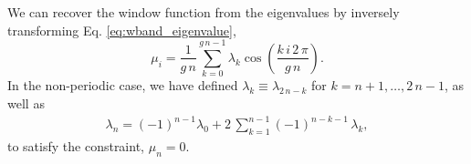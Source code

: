 \documentclass[preprint, superscriptaddress, floatfix]{revtex4-1}
\begin{document}

We can recover the window function from the eigenvalues
by inversely transforming Eq. \eqref{eq:wband_eigenvalue},
%
\begin{equation}
  \mu_i
  =
  \frac { 1 } { g \, n }
  \sum_{ k = 0 }^{ g \, n - 1 }
  \lambda_k
  \cos \left(
       \frac{ k \, i \, 2 \, \pi }
            {      g \, n        }
  \right)
  .
\label{eq:mu_from_lambda}
\end{equation}
%
In the non-periodic case,
we have defined
$\lambda_k \equiv \lambda_{2 \, n - k}$
for $k = n + 1, \dots, 2 \, n - 1$,
as well as
%
\begin{align}
  \lambda_n
  =
  (-1)^{ n - 1 }
  \lambda_0
  +
  2 \, \sum_{ k = 1 }^{ n - 1 }
      (-1)^{n - k - 1} \, \lambda_k
  ,
\label{eq:lambdan}
\end{align}
to satisfy the constraint, $\mu_n = 0$.
%
\end{document}
